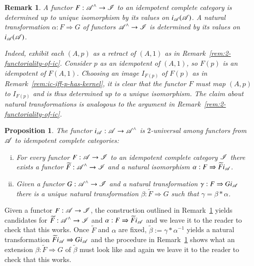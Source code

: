 \documentclass[1p]{elsarticle}
\makeatletter
\renewenvironment{proof}[1][\proofname]{\par
  \pushQED{\qed}%
  \normalfont \topsep6\p@\@plus6\p@\relax
  \trivlist
  \item[\hskip\labelsep
        \scshape
    #1\@addpunct{.}]\ignorespaces
}{%
  \popQED\endtrivlist\@endpefalse
}
\theoremstyle{mythm}
\newtheorem{Prop}[Thm]{Proposition}
\theoremstyle{mydef}
\newtheorem{Rem}[Thm]{Remark}
\makeatother
\begin{document}
\begin{Rem}
  \label{rem:uniqueness-of-fctrs-to-ic-cat}
  A functor $F: \operatorname{\mathscr{A}}^{\wedge} \to \operatorname{\mathscr{I}}$ to an idempotent complete
  category is determined up to unique isomorphism by its values on
  $i_{\operatorname{\mathscr{A}}}{(\operatorname{\mathscr{A}})}$. A natural transformation $\alpha: F
  \Rightarrow G$ of functors $\operatorname{\mathscr{A}}^{\wedge} \to \operatorname{\mathscr{I}}$ is determined
  by its values on $i_{\operatorname{\mathscr{A}}}{(\operatorname{\mathscr{A}})}$.
  
  Indeed, exhibit each $(A,p)$ as a retract of
  $(A,1)$ as in Remark~\ref{rem:2-functoriality-of-ic}. 
  Consider $p$ as an
  idempotent of $(A,1)$, so $F(p)$ is an idempotent of
  $F(A,1)$. Choosing an image $I_{F(p)}$ of $F(p)$ as in
  Remark~\ref{rem:ic-iff-p-has-kernel}, it is clear that
  the functor $F$ must
  map $(A,p)$ to $I_{F(p)}$ and is thus determined up to a
  unique isomorphism. The claim about natural transformations is
  analogous to the argument in Remark~\ref{rem:2-functoriality-of-ic}.
\end{Rem}

\begin{Prop}
  \label{prop:idempotent-completion-additive}
  The functor $i_{\operatorname{\mathscr{A}}}: \operatorname{\mathscr{A}} \to \operatorname{\mathscr{A}}^{\wedge}$ is $2$-universal among
  functors from $\operatorname{\mathscr{A}}$ to idempotent complete categories:
  \begin{enumerate}[(i)]
    \item
      For every functor $F: \operatorname{\mathscr{A}} \to \operatorname{\mathscr{I}}$ to an idempotent complete
      category $\operatorname{\mathscr{I}}$ there exists a functor
      $\widetilde{F}: \operatorname{\mathscr{A}}^{\wedge} \to \operatorname{\mathscr{I}}$ and a
      natural isomorphism 
      $\alpha: F \Rightarrow \widetilde{F}i_{\operatorname{\mathscr{A}}}$.

    \item
      Given a functor $G: \operatorname{\mathscr{A}}^{\wedge} \to \operatorname{\mathscr{I}}$
      and a natural transformation $\gamma: F \Rightarrow Gi_{\operatorname{\mathscr{A}}}$
      there is a unique natural transformation $\beta:\widetilde{F}
      \Rightarrow G$ such that $\gamma = \beta \ast \alpha$.
  \end{enumerate}
\end{Prop}

\begin{proof}[Sketch of the Proof]
  Given a functor $F: \operatorname{\mathscr{A}} \to \operatorname{\mathscr{I}}$, the construction outlined in
  Remark~\ref{rem:uniqueness-of-fctrs-to-ic-cat} yields candidates
  for $\widetilde{F}: \operatorname{\mathscr{A}}^{\wedge} \to \operatorname{\mathscr{I}}$ and 
  $\alpha: F \Rightarrow \widetilde{F}i_{\operatorname{\mathscr{A}}}$ and we leave it to the
  reader to check that this works. Once $\widetilde{F}$ and $\alpha$
  are fixed, $\widetilde{\beta} := \gamma \ast \alpha^{-1}$ 
  yields a natural transformation
  $\widetilde{F}i_{\operatorname{\mathscr{A}}} \Rightarrow G i_{\operatorname{\mathscr{A}}}$ and the procedure
  in Remark~\ref{rem:uniqueness-of-fctrs-to-ic-cat} shows what an
  extension $\beta: \widetilde{F} \Rightarrow G$ of
  $\widetilde{\beta}$ 
  must look like and
  again we leave it to the reader to check that this works.
\end{proof}
\end{document}
